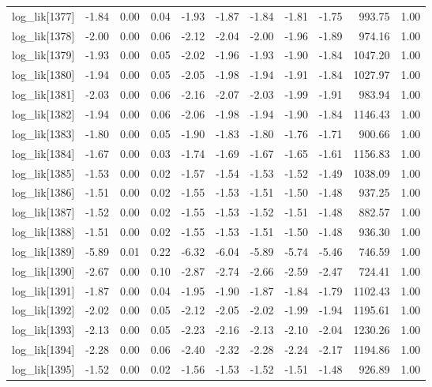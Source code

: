 \begin{table}[ht]
\begin{tabular}{rrrrrrrrrrr}
  log\_lik[1377] & -1.84 & 0.00 & 0.04 & -1.93 & -1.87 & -1.84 & -1.81 & -1.75 & 993.75 & 1.00 \\ 
  log\_lik[1378] & -2.00 & 0.00 & 0.06 & -2.12 & -2.04 & -2.00 & -1.96 & -1.89 & 974.16 & 1.00 \\ 
  log\_lik[1379] & -1.93 & 0.00 & 0.05 & -2.02 & -1.96 & -1.93 & -1.90 & -1.84 & 1047.20 & 1.00 \\ 
  log\_lik[1380] & -1.94 & 0.00 & 0.05 & -2.05 & -1.98 & -1.94 & -1.91 & -1.84 & 1027.97 & 1.00 \\ 
  log\_lik[1381] & -2.03 & 0.00 & 0.06 & -2.16 & -2.07 & -2.03 & -1.99 & -1.91 & 983.94 & 1.00 \\ 
  log\_lik[1382] & -1.94 & 0.00 & 0.06 & -2.06 & -1.98 & -1.94 & -1.90 & -1.84 & 1146.43 & 1.00 \\ 
  log\_lik[1383] & -1.80 & 0.00 & 0.05 & -1.90 & -1.83 & -1.80 & -1.76 & -1.71 & 900.66 & 1.00 \\ 
  log\_lik[1384] & -1.67 & 0.00 & 0.03 & -1.74 & -1.69 & -1.67 & -1.65 & -1.61 & 1156.83 & 1.00 \\ 
  log\_lik[1385] & -1.53 & 0.00 & 0.02 & -1.57 & -1.54 & -1.53 & -1.52 & -1.49 & 1038.09 & 1.00 \\ 
  log\_lik[1386] & -1.51 & 0.00 & 0.02 & -1.55 & -1.53 & -1.51 & -1.50 & -1.48 & 937.25 & 1.00 \\ 
  log\_lik[1387] & -1.52 & 0.00 & 0.02 & -1.55 & -1.53 & -1.52 & -1.51 & -1.48 & 882.57 & 1.00 \\ 
  log\_lik[1388] & -1.51 & 0.00 & 0.02 & -1.55 & -1.53 & -1.51 & -1.50 & -1.48 & 936.30 & 1.00 \\ 
  log\_lik[1389] & -5.89 & 0.01 & 0.22 & -6.32 & -6.04 & -5.89 & -5.74 & -5.46 & 746.59 & 1.00 \\ 
  log\_lik[1390] & -2.67 & 0.00 & 0.10 & -2.87 & -2.74 & -2.66 & -2.59 & -2.47 & 724.41 & 1.00 \\ 
  log\_lik[1391] & -1.87 & 0.00 & 0.04 & -1.95 & -1.90 & -1.87 & -1.84 & -1.79 & 1102.43 & 1.00 \\ 
  log\_lik[1392] & -2.02 & 0.00 & 0.05 & -2.12 & -2.05 & -2.02 & -1.99 & -1.94 & 1195.61 & 1.00 \\ 
  log\_lik[1393] & -2.13 & 0.00 & 0.05 & -2.23 & -2.16 & -2.13 & -2.10 & -2.04 & 1230.26 & 1.00 \\ 
  log\_lik[1394] & -2.28 & 0.00 & 0.06 & -2.40 & -2.32 & -2.28 & -2.24 & -2.17 & 1194.86 & 1.00 \\ 
  log\_lik[1395] & -1.52 & 0.00 & 0.02 & -1.56 & -1.53 & -1.52 & -1.51 & -1.48 & 926.89 & 1.00 \\ 

\end{tabular}
\end{table}
